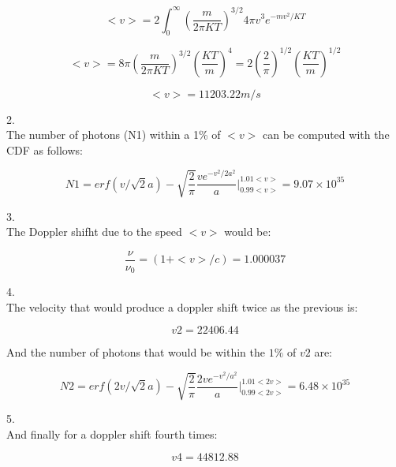 \documentclass[12pt]{article}
\begin{document}
\begin{equation}
<v> = 2\int_0^{\infty} \left( \dfrac{m}{2\pi KT}  \right)^{3/2} 4\pi v^3 e^{-mv^2/KT}
\end{equation}

\begin{equation}
<v> = 8\pi \left( \dfrac{m}{2\pi KT}  \right)^{3/2} \left(\dfrac{KT}{m}\right)^4
= 2 \left( \dfrac{2}{\pi} \right)^{1/2} \left( \dfrac{KT}{m}  \right)^{1/2}
\end{equation}

\begin{equation}
<v> = 11203.22 m/s
\end{equation}

2. \\ 

The number of photons (N1) within a 1\% of $<v>$ can be computed with the CDF as follows:


\begin{equation}
N1 = erf(v/\sqrt{2}a) - \sqrt{\dfrac{2}{\pi}} \dfrac{v e^{-v^2/2a^2}}{a} \Bigg|_{0.99<v>}^{1.01<v>}  = 9.07\times 10^{35} 
\end{equation}

3. \\

The Doppler shifht due to the speed $<v>$ would be:

\begin{equation}
\dfrac{\nu}{\nu_0} = (1 + <v>/c) =  1.000037
\end{equation}

4. \\ 

The velocity that would produce a doppler shift twice as the previous
is:

\begin{equation}
v2 = 22406.44
\end{equation} 

And the number of photons that would be within the $1\%$ 
of $v2$ are:

\begin{equation}
N2 = erf(2v/\sqrt{2}a) - \sqrt{\dfrac{2}{\pi}} \dfrac{2v e^{-v^2/a^2}}{a} \Bigg|_{0.99<2v>}^{1.01<2v>}  = 6.48\times 10^{35} 
\end{equation}

5.\\

And finally for a doppler shift fourth times:

\begin{equation}
v4 = 44812.88 
\end{equation}
\end{document}
